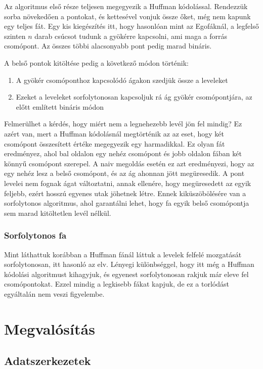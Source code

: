 \documentclass[12pt]{report}
\begin{document}
Az algoritmus első része teljesen megegyezik a Huffman kódolással.
Rendezzük sorba növekedően a pontokat, és kettesével vonjuk össze őket, még nem kapunk egy teljes fát.
Egy kis kiegészítés itt, hogy hasonlóan mint az Egofáknál, a legfelső szinten \(n\) darab csúcsot tudunk a gyökérre kapcsolni, ami maga a forrás csomópont.
Az összes többi alacsonyabb pont pedig marad bináris.

A belső pontok kitöltése pedig a következő módon történik:
\begin{enumerate}
	\item A gyökér csomóponthoz kapcsolódó ágakon szedjük össze a leveleket
	\item Ezeket a leveleket sorfolytonosan kapcsoljuk rá ág gyökér csomópontjára, az előtt említett bináris módon
\end{enumerate}
 
Felmerülhet a kérdés, hogy miért nem a legnehezebb levél jön fel mindig?
Ez azért van, mert a Huffman kódolásnál megtörténik az az eset, hogy két csomópont összesített értéke megegyezik egy harmadikkal.
Ez olyan fát eredményez, ahol bal oldalon egy nehéz csomópont és jobb oldalon fában két könnyű csomópont szerepel.
A naiv megoldás esetén ez azt eredményezi, hogy az egy nehéz lesz a belső csomópont, és az ág ahonnan jött megüresedik.
A pont levelei nem fognak ágat változtatni, annak ellenére, hogy megüresedett az egyik feljebb, ezért hosszú egyenes utak jöhetnek létre.
Ennek kiküszöbölésére van a sorfolytonos algoritmus, ahol garantálni lehet, hogy fa egyik belső csomópontja sem marad kitöltetlen levél nélkül.

\subsection{Sorfolytonos fa}

Mint láthattuk korábban a Huffman fánál láttuk a levelek felfelé mozgatását sorfolytonosan, itt hasonló az elv.
Lényegi különbséggel, hogy itt még a Huffman kódolási algoritmust kihagyjuk, és egyenest sorfolytonosan rakjuk már eleve fel csomópontokat.
Ezzel mindig a legkisebb fákat kapjuk, de ez a torlódást egyáltalán nem veszi figyelembe.

\chapter{Megvalósítás}


\section{Adatszerkezetek}
\end{document}
